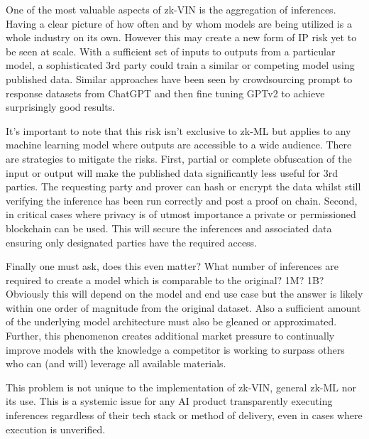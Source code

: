 \documentclass[conference]{IEEEtran}
\begin{document}
One of the most valuable aspects of zk-VIN is the aggregation of inferences. Having a clear picture of how often and by whom models are being utilized is a whole industry on its own. However this may create a new form of IP risk yet to be seen at scale. With a sufficient set of inputs to outputs from a particular model, a sophisticated 3rd party could train a similar or competing model using published data.
Similar approaches have been seen by crowdsourcing prompt to response datasets from ChatGPT and then fine tuning GPTv2 to achieve surprisingly good results.

It's important to note that this risk isn't exclusive to zk-ML but applies to any machine learning model where outputs are accessible to a wide audience. There are strategies to mitigate the risks.  First, partial or complete obfuscation of the input or output will make the published data significantly less useful for 3rd parties. The requesting party and prover can hash or encrypt the data whilst still verifying the inference has been run correctly and post a proof on chain.  Second, in critical cases where privacy is of utmost importance a private or permissioned blockchain can be used. This will secure the inferences and associated data ensuring only designated parties have the required access.

Finally one must ask, does this even matter? What number of inferences are required to create a model which is comparable to the original? 1M? 1B? Obviously this will depend on the model and end use case but the answer is likely within one order of magnitude from the original dataset. Also a sufficient amount of the underlying model architecture must also be gleaned or approximated. Further, this phenomenon creates additional market pressure to continually improve models with the knowledge a competitor is working to surpass others who can (and will) leverage all available materials.

This problem is not unique to the implementation of zk-VIN, general zk-ML nor its use. This is a systemic issue for any AI product transparently executing inferences regardless of their tech stack or method of delivery, even in cases where execution is unverified.
\end{document}
